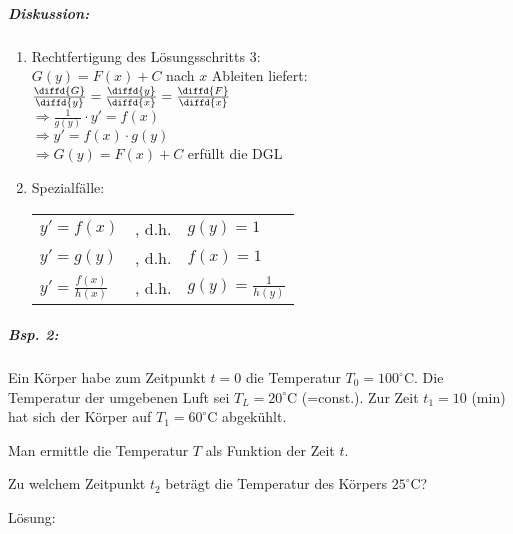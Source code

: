 \subparagraph{Diskussion:}
\begin{enumerate}
\item Rechtfertigung des Lösungsschritts 3: \\
$G(y)=F(x)+C$ nach $x$ Ableiten liefert:\\
$\frac{\diffd{G}}{\diffd{y}}=\frac{\diffd{y}}{\diffd{x}}=\frac{\diffd{F}}{\diffd{x}}$\\
$\Rightarrow \frac{1}{g(y)}\cdot y'=f(x)$\\
$\Rightarrow y'=f(x) \cdot g(y)$\\
$\Rightarrow G(y)=F(x)+C$ erfüllt die DGL 
\item Spezialfälle:\\
\begin{tabular}{l l l}
$y'=f(x)$ & , d.h. & $g(y)=1$\\
$y'=g(y)$ & , d.h. & $f(x)=1$\\
$y'=\frac{f(x)}{h(x)}$ & , d.h. & $g(y)=\frac{1}{h(y)}$
\end{tabular}
\end{enumerate}
\subparagraph{Bsp. 2:} Ein Körper habe zum Zeitpunkt $t=0$ die Temperatur $T_0=100^\circ \mathrm{C}$. Die Temperatur der umgebenen Luft sei $T_L=20^\circ\mathrm{C}$ (=const.). Zur Zeit $t_1=10$ (min) hat sich der Körper auf $T_1=60^\circ\mathrm{C}$ abgekühlt.
\begin{anumerate}
\item Man ermittle die Temperatur $T$ als Funktion der Zeit $t$.
\item Zu welchem Zeitpunkt $t_2$ beträgt die Temperatur des Körpers $25^\circ \mathrm{C}$?
\end{anumerate}
Lösung:

